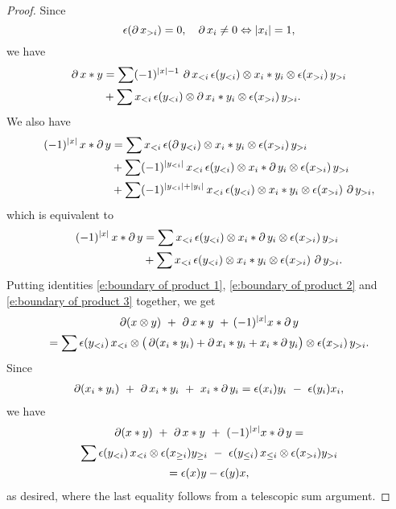 \begin{proof}
	Since
	\[
	\epsilon(\operatorname{\partial} x_{>i}) = 0, \quad \operatorname{\partial} x_i \neq 0 \Leftrightarrow |x_i| = 1,
	\]
	we have
	\begin{equation} \label{e:boundary of product 2}
		\begin{split}
			\operatorname{\partial} x \ast y & =
			\sum (-1)^{|x|-1} \, \operatorname{\partial} x_{<i}\, \epsilon(y_{<i}) \otimes x_i \ast y_i \otimes \epsilon(x_{>i})\, y_{>i} \\ & +
			\sum x_{<i}\, \epsilon(y_{<i}) \otimes \operatorname{\partial} x_i \ast y_i \otimes \epsilon(x_{>i})\, y_{>i}.
		\end{split}
	\end{equation}
	We also have
	\begin{align*}
		(-1)^{|x|} \, x \ast \operatorname{\partial} y & =
		\sum x_{<i} \, \epsilon(\operatorname{\partial} y_{<i}) \otimes x_i \ast y_i \otimes \epsilon(x_{>i})\, y_{>i} \\ & +
		\sum (-1)^{|y_{<i}|} \, x_{<i}\, \epsilon(y_{<i}) \otimes x_i \ast \operatorname{\partial} y_i \otimes \epsilon(x_{>i}) \, y_{>i} \\ & +
		\sum (-1)^{|y_{<i}| + |y_i|} \, x_{<i}\, \epsilon(y_{<i}) \otimes x_i \ast y_i \otimes \epsilon(x_{>i}) \, \operatorname{\partial} y_{>i},
	\end{align*}
	which is equivalent to
	\begin{equation} \label{e:boundary of product 3}
		\begin{split}
			(-1)^{|x|} \, x \ast \operatorname{\partial} y & =
			\sum x_{<i} \, \epsilon(y_{<i}) \otimes x_i \ast \operatorname{\partial} y_i \otimes \epsilon(x_{>i})\, y_{>i} \\ & +
			\sum x_{<i}\, \epsilon(y_{<i}) \otimes x_i \ast y_i \otimes \epsilon(x_{>i})\, \operatorname{\partial} y_{>i}.
		\end{split}
	\end{equation}
	Putting identities \eqref{e:boundary of product 1}, \eqref{e:boundary of product 2} and \eqref{e:boundary of product 3} together, we get
	\begin{multline*}
		\operatorname{\partial} (x \otimes y) \ +\ \operatorname{\partial} x \ast y\ +\, (-1)^{|x|}x \ast \operatorname{\partial} y \\
		= \sum \epsilon(y_{<i})\, x_{<i} \otimes \big(\operatorname{\partial}(x_i \ast y_i) + \operatorname{\partial} x_i \ast y_i + x_i \ast \operatorname{\partial} y_i\big) \otimes \epsilon(x_{>i})\, y_{>i}.
	\end{multline*}
	Since
	\begin{align*}
		\operatorname{\partial}(x_i \ast y_i)\ +\ \operatorname{\partial} x_i \ast y_i\ +\ x_i \ast \operatorname{\partial} y_i =
		\epsilon(x_i)y_i\ -\ \epsilon(y_i)x_i,
	\end{align*}
	we have
	\begin{multline*}
		\operatorname{\partial} (x \ast y) \ +\ \operatorname{\partial} x \ast y\ +\ (-1)^{|x|}x \ast \operatorname{\partial} y  = \\
		\sum \epsilon(y_{<i}) \, x_{<i} \otimes \epsilon(x_{\geq i}) y_{\geq i}\ -\
		\epsilon(y_{\leq i}) \, x_{\leq i} \otimes \epsilon(x_{>i}) y_{>i} \\ =
		\epsilon(x)y - \epsilon(y)x,
	\end{multline*}
	as desired, where the last equality follows from a telescopic sum argument.
\end{proof}

